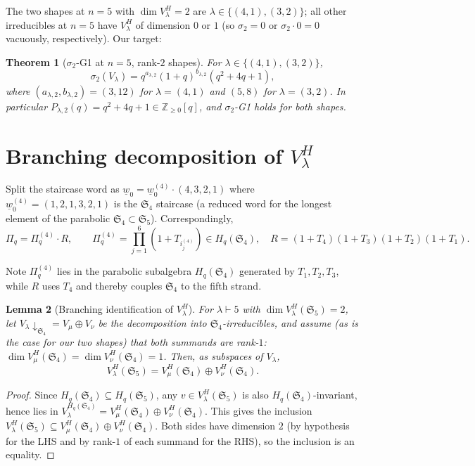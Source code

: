 \documentclass[11pt]{article}
\theoremstyle{plain}
\newtheorem{theorem}{Theorem}
\newtheorem{lemma}[theorem]{Lemma}
\theoremstyle{definition}
\theoremstyle{remark}
\newcommand{\Z}{\mathbb{Z}}
\newcommand{\Sym}{\mathfrak{S}}
\newcommand{\Hq}{H_q}
\newcommand{\Pibs}{\Pi_q}
\newcommand{\Vlam}{V_\lambda}
\begin{document}
The two shapes at $n = 5$ with $\dim V_\lambda^H = 2$ are
$\lambda \in \{(4,1), (3,2)\}$; all other irreducibles at $n = 5$ have
$V_\lambda^H$ of dimension $0$ or $1$ (so $\sigma_2 = 0$ or
$\sigma_2 \cdot 0 = 0$ vacuously, respectively). Our target:

\begin{theorem}[$\sigma_2$-G1 at $n = 5$, rank-$2$ shapes]\label{thm:main}
For $\lambda \in \{(4,1), (3,2)\}$,
\[ \sigma_2(\Vlam) = q^{a_{\lambda,2}} (1+q)^{b_{\lambda,2}} (q^2 + 4q + 1), \]
where $(a_{\lambda,2}, b_{\lambda,2}) = (3, 12)$ for $\lambda = (4,1)$ and
$(5, 8)$ for $\lambda = (3,2)$. In particular $P_{\lambda,2}(q) = q^2 + 4q + 1 \in \Z_{\geq 0}[q]$, and $\sigma_2$-G1 holds for both shapes.
\end{theorem}

\section{Branching decomposition of $V_\lambda^H$}\label{sec:branching}

Split the staircase word as $\underline{w}_0 = \underline{w}_0^{(4)} \cdot (4, 3, 2, 1)$
where $\underline{w}_0^{(4)} = (1, 2, 1, 3, 2, 1)$ is the $\Sym_4$ staircase (a reduced
word for the longest element of the parabolic $\Sym_4 \subset \Sym_5$). Correspondingly,
\[ \Pibs = \Pibs^{(4)} \cdot R, \qquad \Pibs^{(4)} = \prod_{j=1}^{6}(1+T_{i^{(4)}_j}) \in \Hq(\Sym_4), \quad R = (1+T_4)(1+T_3)(1+T_2)(1+T_1). \]

Note $\Pibs^{(4)}$ lies in the parabolic subalgebra $\Hq(\Sym_4)$ generated by
$T_1, T_2, T_3$, while $R$ uses $T_4$ and thereby couples $\Sym_4$ to the fifth strand.

\begin{lemma}[Branching identification of $V_\lambda^H$]\label{lem:branching}
For $\lambda \vdash 5$ with $\dim V_\lambda^H(\Sym_5) = 2$, let $V_\lambda \downarrow_{\Sym_4} = V_\mu \oplus V_\nu$ be the decomposition into $\Sym_4$-irreducibles, and assume (as is the case for our two shapes) that both summands are rank-$1$: $\dim V_\mu^H(\Sym_4) = \dim V_\nu^H(\Sym_4) = 1$.
Then, as subspaces of $V_\lambda$,
\[ V_\lambda^H(\Sym_5) = V_\mu^H(\Sym_4) \oplus V_\nu^H(\Sym_4). \]
\end{lemma}

\begin{proof}
Since $\Hq(\Sym_4) \subseteq \Hq(\Sym_5)$, any $v \in V_\lambda^H(\Sym_5)$
is also $\Hq(\Sym_4)$-invariant, hence lies in $V_\lambda^{\Hq(\Sym_4)} = V_\mu^H(\Sym_4) \oplus V_\nu^H(\Sym_4)$. This gives the inclusion
$V_\lambda^H(\Sym_5) \subseteq V_\mu^H(\Sym_4) \oplus V_\nu^H(\Sym_4)$.
Both sides have dimension $2$ (by hypothesis for the LHS and by
rank-$1$ of each summand for the RHS), so the inclusion is an equality.
\end{proof}
\end{document}
